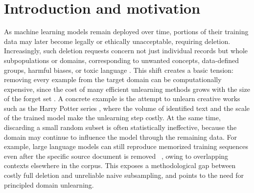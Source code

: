 \vspace{-3 mm}
\section{Introduction and motivation} \label{sec:Intro}
\vspace{-2mm}


As machine learning models remain deployed over time, portions of their training data may later become legally or ethically unacceptable, requiring deletion. Increasingly, such deletion requests concern not just individual records but whole subpopulations or domains, corresponding to unwanted concepts, data-defined groups, harmful biases, or toxic language \citet{kurmanji2024towards}. This shift creates a basic tension: removing every example from the target domain can be computationally expensive, since the cost of many efficient unlearning methods grows with the size of the forget set \citet{guo2020certified}. A concrete example is the attempt to unlearn creative works such as the Harry Potter series \citet{eldan2023s}, where the volume of identified text and the scale of the trained model make the unlearning step costly. At the same time, discarding a small random subset is often statistically ineffective, because the domain may continue to influence the model through the remaining data. For example, large language models can still reproduce memorized training sequences even after the specific source document is removed ~\citep{liu2025language}, owing to overlapping contexts elsewhere in the corpus. This exposes a methodological gap between costly full deletion and unreliable naive subsampling, and points to the need for principled domain unlearning.


